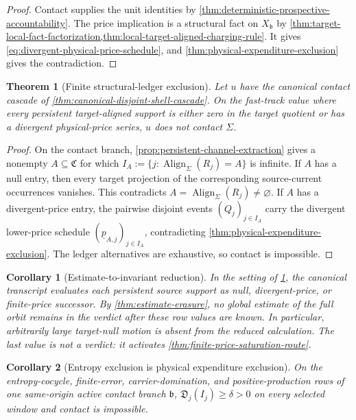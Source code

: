\documentclass[11pt]{article}
\numberwithin{section}{part}
\theoremstyle{plain}
\newtheorem{theorem}{Theorem}[section]
\newtheorem{corollary}[corollary]{Corollary}
\theoremstyle{definition}
\theoremstyle{remark}
\newcommand{\Channels}{\mathfrak C}
\newcommand{\Align}{\operatorname{Align}}
\newcommand{\Production}{\mathfrak D}
\begin{document}
\begin{proof}
Contact supplies the unit identities by
\cref{thm:deterministic-prospective-accountability}.  The price implication
is a structural fact on \(X_{\mathfrak b}\) by
\cref{thm:target-local-fact-factorization,thm:local-target-aligned-charging-rule}.
It gives \eqref{eq:divergent-physical-price-schedule}, and
\cref{thm:physical-expenditure-exclusion} gives the contradiction.
\end{proof}

\begin{theorem}[Finite structural-ledger exclusion]
\label{thm:finite-structural-ledger-exclusion}
Let \(u\) have the canonical contact cascade of
\cref{thm:canonical-disjoint-shell-cascade}.  On the fast-track value where
every persistent target-aligned support is either zero in the target quotient
or has a divergent physical-price series, \(u\)
does not contact \(\Sigma\).
\end{theorem}

\begin{proof}
On the contact branch, \cref{prop:persistent-channel-extraction} gives a
nonempty \(A\subseteq\Channels\) for which
\(I_A:=\{j:\Align_\Sigma(R_j)=A\}\) is infinite.  If \(A\) has a null entry,
then every target projection of the corresponding source-current occurrences
vanishes.  This contradicts \(A=\Align_\Sigma(R_j)\ne\varnothing\).  If
\(A\) has a divergent-price entry, the pairwise disjoint events
\((Q_j)_{j\in I_A}\) carry the divergent lower-price schedule
  \((\underline p_{A,j})_{j\in I_A}\), contradicting
\cref{thm:physical-expenditure-exclusion}.  The ledger alternatives are
exhaustive, so contact is impossible.
\end{proof}

\begin{corollary}[Estimate-to-invariant reduction]
\label{cor:estimate-to-invariant-reduction}
In the setting of \cref{thm:finite-structural-ledger-exclusion}, the canonical
transcript evaluates each persistent source support as null,
divergent-price, or finite-price successor.  By
\cref{thm:estimate-erasure}, no global estimate of the full orbit remains in
the verdict after these row values are known.  In particular, arbitrarily
large target-null motion is absent from the reduced calculation.  The last
value is not a verdict: it activates
\cref{thm:finite-price-saturation-route}.
\end{corollary}

\begin{corollary}[Entropy exclusion is physical expenditure exclusion]
\label{cor:entropy-expenditure-exclusion}
On the entropy-cocycle, finite-error, carrier-domination, and
positive-production rows of one same-origin active contact branch
\(\mathfrak b\),
\(\Production_j(I_j)\ge\delta>0\) on every selected window and contact is
impossible.
\end{corollary}
\end{document}
